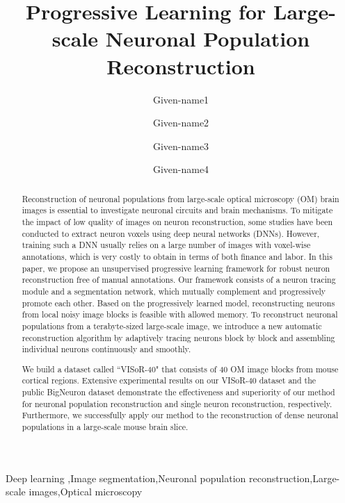 \documentclass[times,twocolumn,final]{elsarticle}
\newcommand{\md}[1]{\textcolor[rgb]{0,0,1}{#1}}
\begin{document}
	

\begin{frontmatter}

\title{Progressive Learning for Large-scale Neuronal Population Reconstruction}                      

\author[1]{Given-name1 }
\author[1]{Given-name2 }
\author[2]{Given-name3 }
\author[2]{Given-name4 }

\address[1]{Affiliation 1, Address, City and Postal Code, Country}
\address[2]{Affiliation 2, Address, City and Postal Code, Country}


\begin{abstract}
Reconstruction of neuronal populations from large-scale optical microscopy (OM) brain images is essential to investigate neuronal circuits and brain mechanisms.
To mitigate the impact of low quality of images on neuron reconstruction, some studies have been conducted to extract neuron voxels using deep neural networks (DNNs).
However, training such a DNN usually relies on a large number of images with voxel-wise annotations, which is very costly to obtain in terms of both finance and labor.
In this paper, we propose an \md{unsupervised} progressive learning framework for robust neuron reconstruction free of manual annotations. Our framework consists of a neuron tracing module and a segmentation network, which mutually complement and progressively promote each other.
Based on the progressively learned model, reconstructing neurons from local noisy image blocks is feasible with allowed memory.
To reconstruct neuronal populations from a terabyte-sized large-scale image, we introduce a new automatic reconstruction algorithm by adaptively tracing neurons block by block and assembling individual neurons continuously and smoothly.

We build a dataset called ``VISoR-40" that consists of 40 OM image blocks from mouse cortical regions. Extensive experimental results on our VISoR-40 dataset and the public BigNeuron dataset demonstrate the effectiveness and superiority of our method for neuronal population reconstruction and single neuron reconstruction, respectively.
Furthermore, we successfully apply our method to the reconstruction of dense neuronal populations in a large-scale mouse brain slice.
\end{abstract}

\begin{keyword}
\KWD Deep learning \sep Image segmentation\sep Neuronal population reconstruction\sep Large-scale images\sep Optical microscopy
\end{keyword}

\end{frontmatter}
\end{document}
